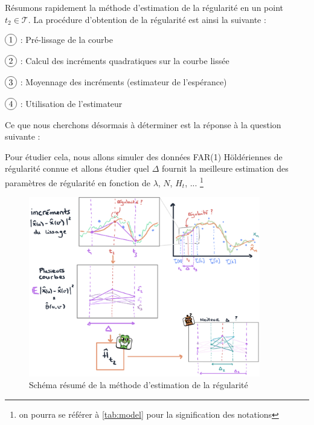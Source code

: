 Résumons rapidement la méthode d'estimation de la régularité en un point $t_2 \in \mathcal T$.
\noindent La procédure d'obtention de la régularité est ainsi la suivante :

$\circled 1$ : Pré-lissage de la courbe

$\circled 2$ : Calcul des incréments quadratiques sur la courbe lissée

$\circled 3$ : Moyennage des incréments (estimateur de l'espérance)

$\circled 4$ : Utilisation de l'estimateur

\smallskip

Ce que nous cherchons désormais à déterminer est la réponse à la question suivante :


Pour étudier cela, nous allons simuler des données FAR(1) Höldériennes de régularité connue et allons étudier quel $\Delta$ fournit la meilleure estimation des paramètres de régularité en fonction de $\lambda$, $N$, $H_t$, ... \footnote{on pourra se référer à \ref{tab:model} pour la signification des notations}

\begin{figure}[H]
	\begin{center}
		\includegraphics[width=0.9\textwidth]{Images/sketches/estim_reg.jpg}
	\end{center}

	\caption{Schéma résumé de la méthode d'estimation de la régularité}
	\label{fig:sketch_estim_reg_methodo}
\end{figure}

